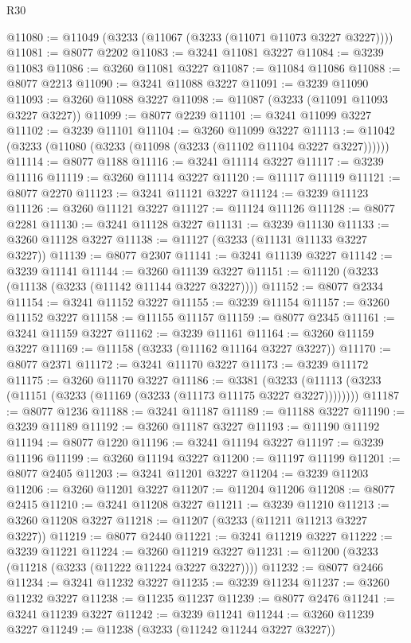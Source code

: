 \begin{lexlean}{R30}
\begin{coremodule}
@11080 := @11049 (@3233 (@11067 (@3233 (@11071 @11073 @3227 @3227))))
@11081 := @8077 @2202
@11083 := @3241 @11081 @3227
@11084 := @3239 @11083
@11086 := @3260 @11081 @3227
@11087 := @11084 @11086
@11088 := @8077 @2213
@11090 := @3241 @11088 @3227
@11091 := @3239 @11090
@11093 := @3260 @11088 @3227
@11098 := @11087 (@3233 (@11091 @11093 @3227 @3227))
@11099 := @8077 @2239
@11101 := @3241 @11099 @3227
@11102 := @3239 @11101
@11104 := @3260 @11099 @3227
@11113 := @11042 (@3233 (@11080 (@3233 (@11098 (@3233 (@11102 @11104 @3227 @3227))))))
@11114 := @8077 @1188
@11116 := @3241 @11114 @3227
@11117 := @3239 @11116
@11119 := @3260 @11114 @3227
@11120 := @11117 @11119
@11121 := @8077 @2270
@11123 := @3241 @11121 @3227
@11124 := @3239 @11123
@11126 := @3260 @11121 @3227
@11127 := @11124 @11126
@11128 := @8077 @2281
@11130 := @3241 @11128 @3227
@11131 := @3239 @11130
@11133 := @3260 @11128 @3227
@11138 := @11127 (@3233 (@11131 @11133 @3227 @3227))
@11139 := @8077 @2307
@11141 := @3241 @11139 @3227
@11142 := @3239 @11141
@11144 := @3260 @11139 @3227
@11151 := @11120 (@3233 (@11138 (@3233 (@11142 @11144 @3227 @3227))))
@11152 := @8077 @2334
@11154 := @3241 @11152 @3227
@11155 := @3239 @11154
@11157 := @3260 @11152 @3227
@11158 := @11155 @11157
@11159 := @8077 @2345
@11161 := @3241 @11159 @3227
@11162 := @3239 @11161
@11164 := @3260 @11159 @3227
@11169 := @11158 (@3233 (@11162 @11164 @3227 @3227))
@11170 := @8077 @2371
@11172 := @3241 @11170 @3227
@11173 := @3239 @11172
@11175 := @3260 @11170 @3227
@11186 := @3381
    (@3233 (@11113 (@3233 (@11151 (@3233 (@11169 (@3233 (@11173 @11175 @3227 @3227))))))))
@11187 := @8077 @1236
@11188 := @3241 @11187
@11189 := @11188 @3227
@11190 := @3239 @11189
@11192 := @3260 @11187 @3227
@11193 := @11190 @11192
@11194 := @8077 @1220
@11196 := @3241 @11194 @3227
@11197 := @3239 @11196
@11199 := @3260 @11194 @3227
@11200 := @11197 @11199
@11201 := @8077 @2405
@11203 := @3241 @11201 @3227
@11204 := @3239 @11203
@11206 := @3260 @11201 @3227
@11207 := @11204 @11206
@11208 := @8077 @2415
@11210 := @3241 @11208 @3227
@11211 := @3239 @11210
@11213 := @3260 @11208 @3227
@11218 := @11207 (@3233 (@11211 @11213 @3227 @3227))
@11219 := @8077 @2440
@11221 := @3241 @11219 @3227
@11222 := @3239 @11221
@11224 := @3260 @11219 @3227
@11231 := @11200 (@3233 (@11218 (@3233 (@11222 @11224 @3227 @3227))))
@11232 := @8077 @2466
@11234 := @3241 @11232 @3227
@11235 := @3239 @11234
@11237 := @3260 @11232 @3227
@11238 := @11235 @11237
@11239 := @8077 @2476
@11241 := @3241 @11239 @3227
@11242 := @3239 @11241
@11244 := @3260 @11239 @3227
@11249 := @11238 (@3233 (@11242 @11244 @3227 @3227))

\end{coremodule}
\end{lexlean}
